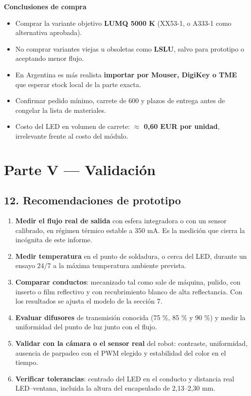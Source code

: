 \documentclass[11pt,a4paper]{article}
\newenvironment{notaclave}[1]
  {\begin{notaclavebase}{\sffamily\scriptsize\bfseries\color{amber}#1}\par\vspace{2pt}}
  {\end{notaclavebase}}
\begin{document}
\begin{notaclave}{Conclusiones de compra}
\begin{itemize}
\item Comprar la variante objetivo \textbf{LUMQ 5000 K} (XX53-1, o A333-1 como alternativa aprobada).
\item No comprar variantes viejas u obsoletas como \textbf{LSLU}, salvo para prototipo o aceptando menor flujo.
\item En Argentina es más realista \textbf{importar por Mouser, DigiKey o TME} que esperar stock local de la parte exacta.
\item Confirmar pedido mínimo, carrete de 600 y plazos de entrega antes de congelar la lista de materiales.
\item Costo del LED en volumen de carrete: \textbf{$\approx$ 0,60 EUR por unidad}, irrelevante frente al costo del módulo.
\end{itemize}

\end{notaclave}
\clearpage

\section*{Parte V — Validación}


\subsection*{12. Recomendaciones de prototipo}

\begin{enumerate}
\item \textbf{Medir el flujo real de salida} con esfera integradora o con un sensor calibrado, en régimen térmico estable a 350 mA. Es la medición que cierra la incógnita de este informe.
\item \textbf{Medir temperatura} en el punto de soldadura, o cerca del LED, durante un ensayo 24/7 a la máxima temperatura ambiente prevista.
\item \textbf{Comparar conductos}: mecanizado tal como sale de máquina, pulido, con inserto o film reflectivo y con recubrimiento blanco de alta reflectancia. Con los resultados se ajusta el modelo de la sección 7.
\item \textbf{Evaluar difusores} de transmisión conocida (75 \%, 85 \% y 90 \%) y medir la uniformidad del punto de luz junto con el flujo.
\item \textbf{Validar con la cámara o el sensor real} del robot: contraste, uniformidad, ausencia de parpadeo con el PWM elegido y estabilidad del color en el tiempo.
\item \textbf{Verificar tolerancias}: centrado del LED en el conducto y distancia real LED–ventana, incluida la altura del encapsulado de 2,13–2,30 mm.
\end{enumerate}
\end{document}
